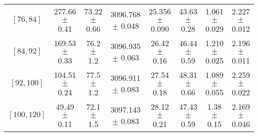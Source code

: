 \begin{tabular}{c||c|c|c|c|c|c|c}
$[76, 84]$ & 277.66 $\pm$ 0.41 & 73.22 $\pm$ 0.66 & 3096.768 $\pm$ 0.048 & 25.356 $\pm$ 0.090 & 43.63 $\pm$ 0.28 & 1.061 $\pm$ 0.029 & 2.227 $\pm$ 0.012\\
$[84, 92]$ & 169.53 $\pm$ 0.33 & 76.2 $\pm$ 1.2 & 3096.935 $\pm$ 0.063 & 26.42 $\pm$ 0.16 & 46.44 $\pm$ 0.59 & 1.210 $\pm$ 0.025 & 2.196 $\pm$ 0.011\\
$[92, 100]$ & 104.51 $\pm$ 0.24 & 77.5 $\pm$ 1.2 & 3096.911 $\pm$ 0.083 & 27.54 $\pm$ 0.18 & 48.31 $\pm$ 0.66 & 1.089 $\pm$ 0.055 & 2.259 $\pm$ 0.022\\
$[100, 120]$ & 49.49 $\pm$ 0.11 & 72.1 $\pm$ 1.5 & 3097.143 $\pm$ 0.083 & 28.12 $\pm$ 0.21 & 47.43 $\pm$ 0.59 & 1.38 $\pm$ 0.15 & 2.169 $\pm$ 0.046\\
\end{tabular}
